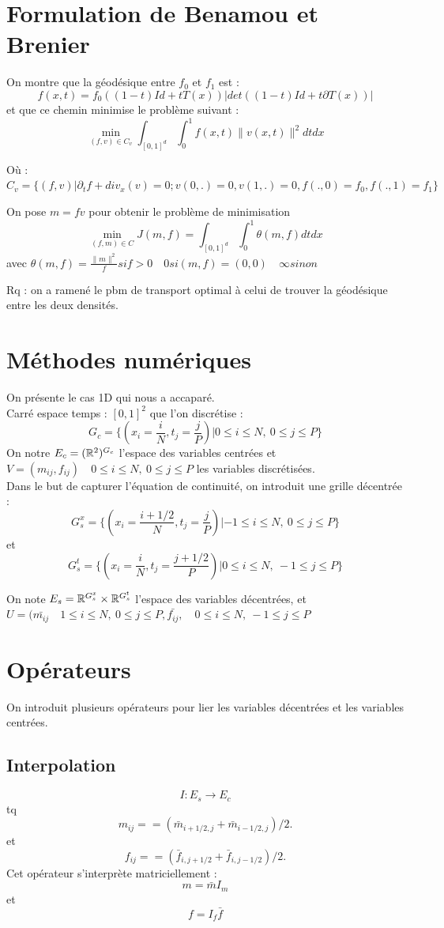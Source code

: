 \documentclass[a4paper,12pt]{article}
\begin{document}
\section{Formulation de Benamou et Brenier}
On montre que la géodésique entre $f_0$ et $f_1$ est : 
$$
f(x,t)=f_0((1-t)Id+tT(x))|det((1-t)Id+t\partial T(x))|
$$
et que ce chemin minimise le problème suivant : 
$$
\min_{(f,v)\in C_v} \int_{[0,1]^d}\int_0^1 f(x,t)\|v(x,t)\|^2dtdx
$$

Où : $C_v= \{(f,v)|\partial_t f+div_x(v)=0;v(0,.)=0,v(1,.)=0,f(.,0)=f_0,f(.,1)=f_1\}$

On pose $m = fv$ pour obtenir le problème de minimisation 
$$
\min_{(f,m)\in C}J(m,f)=\int_{[0,1]^d}\int_0^1 \theta (m,f)dtdx
$$
avec $\theta (m,f) = \frac{\|m\|^2}{f} si f>0 \quad 0 si (m,f)=(0,0)\quad \infty sinon$

Rq : on a ramené le pbm de transport optimal à celui de trouver la géodésique entre les deux densités. 
\section{Méthodes numériques}
On présente le cas 1D qui nous a accaparé. \\
Carré espace temps : $[0,1]^2$ que l'on discrétise : 
$$
G_c = \{(x_i=\frac{i}{N},t_j=\frac{j}{P})|0\leq i\leq N,\ 0\leq j\leq P\}
$$
On notre $E_c =(\mathbb{R}^2)^{G_c}$ l'espace des variables centrées et $ V=(m_{ij},f_{ij}) \quad 0\leq i\leq N,\ 0\leq j\leq P$ les variables discrétisées. \\

Dans le but de capturer l'équation de continuité, on introduit une grille décentrée : 
$$
G_s^x = \{(x_i=\frac{i+1/2}{N},t_j=\frac{j}{P})|-1\leq i\leq N,\ 0\leq j\leq P\}
$$
et 
$$
G_s^t = \{(x_i=\frac{i}{N},t_j=\frac{j+1/2}{P})|0\leq i\leq N,\ -1\leq j\leq P\}
$$

On note $E_s=\mathbb{R}^{G_s^x}\times\mathbb{R}^{G_s^t}$ l'espace des variables décentrées, et $U=(\bar{m_{ij}}\quad 1\leq i\leq N,\ 0\leq j\leq P,\bar{f_{ij}},\quad 0\leq i\leq N,\ -1\leq j\leq P$



\section{Opérateurs}
On introduit plusieurs opérateurs pour lier les variables décentrées et les variables centrées.
\subsection{Interpolation}
$$
I:E_s \rightarrow E_c
$$
tq 
$$
m_{ij} = = (\bar{m}_{i+1/2,j}+\bar{m}_{i-1/2,j})/2.
$$
et
$$
f_{ij} = = (\bar{f}_{i,j+1/2}+\bar{f}_{i,j-1/2})/2.
$$
Cet opérateur s'interprète matriciellement : 
$$
m = \bar{m}I_m
$$
et 
$$
f = I_f\bar{f}
$$
\end{document}
